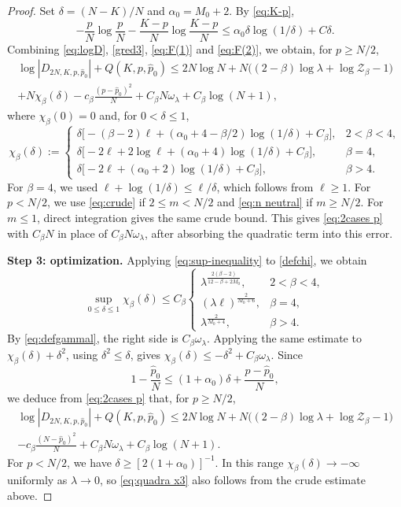 \documentclass[a4paper,10pt,leqno]{amsart}
\numberwithin{equation}{section}
\def\mc{\mathcal}
\begin{document}
\begin{proof}
  Set $\delta=(N-K)/N$ and $\alpha_0=M_0+2$. By \eqref{eq:K-p},
  \[
    -\frac pN\log\frac pN-\frac{K-p}{N}\log\frac{K-p}{N}
    \le\alpha_0\delta\log(1/\delta)+C\delta.
  \]
  Combining \eqref{eq:logD}, \eqref{gred3}, \eqref{eq:F(1)} and \eqref{eq:F(2)}, we obtain, for $p\ge N/2$,
  \begin{multline}\label{eq:2cases p}
    \log|D_{2N,K,p,\widehat p_0}|+Q(K,p,\widehat p_0)
    \le2N\log N+N\bigl((2-\beta)\log\lambda+\log\mc Z_\beta-1\bigr)\\
    +N\chi_\beta(\delta)-c_\beta\frac{(p-\widehat p_0)^2}{N}
    +C_\beta N\omega_\lambda+C_\beta\log(N+1),
  \end{multline}
  where $\chi_\beta(0)=0$ and, for $0<\delta\le1$,
  \begin{equation}\label{defchi}
    \chi_\beta(\delta):=\begin{cases}
      \delta\bigl[-(\beta-2)\ell+(\alpha_0+4-\beta/2)\log(1/\delta)+C_\beta\bigr],&2<\beta<4,\\
      \delta\bigl[-2\ell+2\log\ell+(\alpha_0+4)\log(1/\delta)+C_\beta\bigr],&\beta=4,\\
      \delta\bigl[-2\ell+(\alpha_0+2)\log(1/\delta)+C_\beta\bigr],&\beta>4.
    \end{cases}
  \end{equation}
  For $\beta=4$, we used $\ell+\log(1/\delta)\le\ell/\delta$, which follows from $\ell\ge1$. For $p<N/2$, we use \eqref{eq:crude} if $2\le m<N/2$ and \eqref{eq:n neutral} if $m\ge N/2$. For $m\le1$, direct integration gives the same crude bound. This gives \eqref{eq:2cases p} with $C_\beta N$ in place of $C_\beta N\omega_\lambda$, after absorbing the quadratic term into this error.

  \noindent
  \textbf{Step 3: optimization.} Applying \eqref{eq:sup-inequality} to \eqref{defchi}, we obtain
  \[
    \sup_{0\le\delta\le1}\chi_\beta(\delta)\le C_\beta\begin{cases}
      \lambda^{\frac{2(\beta-2)}{12-\beta+2M_0}},&2<\beta<4,\\
      (\lambda\ell)^{\frac{2}{M_0+6}},&\beta=4,\\
      \lambda^{\frac{2}{M_0+4}},&\beta>4.
    \end{cases}
  \]
  By \eqref{eq:defgammal}, the right side is $C_\beta\omega_\lambda$. Applying the same estimate to $\chi_\beta(\delta)+\delta^2$, using $\delta^2\le\delta$, gives $\chi_\beta(\delta)\le-\delta^2+C_\beta\omega_\lambda$. Since
  \[
    1-\frac{\widehat p_0}{N}\le(1+\alpha_0)\delta+\frac{p-\widehat p_0}{N},
  \]
  we deduce from \eqref{eq:2cases p} that, for $p\ge N/2$,
  \begin{multline}\label{eq:quadra x3}
    \log|D_{2N,K,p,\widehat p_0}|+Q(K,p,\widehat p_0)
    \le2N\log N+N\bigl((2-\beta)\log\lambda+\log\mc Z_\beta-1\bigr)\\
    -c_\beta\frac{(N-\widehat p_0)^2}{N}+C_\beta N\omega_\lambda+C_\beta\log(N+1).
  \end{multline}
  For $p<N/2$, we have $\delta\ge[2(1+\alpha_0)]^{-1}$. In this range $\chi_\beta(\delta)\to-\infty$ uniformly as $\lambda\to0$, so \eqref{eq:quadra x3} also follows from the crude estimate above.


\end{proof}
\end{document}
